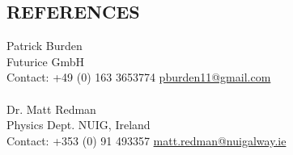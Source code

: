 \documentclass[margin, 10pt]{res} %
\begin{document}
\begin{resume}
\section{REFERENCES}
Patrick Burden \\
Futurice GmbH\\
Contact: +49 (0) 163 3653774 \hfill \href{mailto:pburden11@gmail.com}{pburden11@gmail.com}\\
\\
Dr. Matt Redman\\
Physics Dept. NUIG, Ireland\\
Contact: +353 (0) 91 493357 \hfill \href{mailto:matt.redman@nuigalway.ie}{matt.redman@nuigalway.ie}\\

\end{resume}
\end{document}
